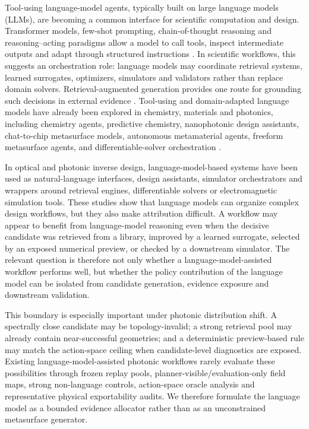 \documentclass[final,1p,times]{elsarticle}
\begin{document}
Tool-using language-model agents, typically built on large language models (LLMs), are becoming a common interface for scientific computation and design. Transformer models, few-shot prompting, chain-of-thought reasoning and reasoning--acting paradigms allow a model to call tools, inspect intermediate outputs and adapt through structured instructions \cite{vaswani2017attention, brown2020language, wei2022chain, yao2023react}. In scientific workflows, this suggests an orchestration role: language models may coordinate retrieval systems, learned surrogates, optimizers, simulators and validators rather than replace domain solvers. Retrieval-augmented generation provides one route for grounding such decisions in external evidence \cite{lewis2020retrieval}. Tool-using and domain-adapted language models have already been explored in chemistry, materials and photonics, including chemistry agents, predictive chemistry, nanophotonic design assistants, chat-to-chip metasurface models, autonomous metamaterial agents, freeform metasurface agents, and differentiable-solver orchestration \cite{bran2024augmenting,jablonka2024leveraging,kim2025nanophotonic,zhang2025chattochip,lu2025agenticframework,lu2025learning,lupoiu2025multi,huang2025mcp}.

In optical and photonic inverse design, language-model-based systems have been used as natural-language interfaces, design assistants, simulator orchestrators and wrappers around retrieval engines, differentiable solvers or electromagnetic simulation tools. These studies show that language models can organize complex design workflows, but they also make attribution difficult. A workflow may appear to benefit from language-model reasoning even when the decisive candidate was retrieved from a library, improved by a learned surrogate, selected by an exposed numerical preview, or checked by a downstream simulator. The relevant question is therefore not only whether a language-model-assisted workflow performs well, but whether the policy contribution of the language model can be isolated from candidate generation, evidence exposure and downstream validation.

This boundary is especially important under photonic distribution shift. A spectrally close candidate may be topology-invalid; a strong retrieval pool may already contain near-successful geometries; and a deterministic preview-based rule may match the action-space ceiling when candidate-level diagnostics are exposed. Existing language-model-assisted photonic workflows rarely evaluate these possibilities through frozen replay pools, planner-visible/evaluation-only field maps, strong non-language controls, action-space oracle analysis and representative physical exportability audits. We therefore formulate the language model as a bounded evidence allocator rather than as an unconstrained metasurface generator.
\end{document}
